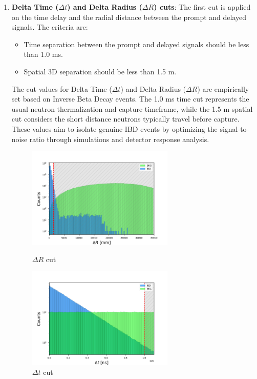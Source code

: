 \begin{enumerate}
	\item \textbf{Delta Time ($\Delta t$) and Delta Radius ($\Delta R$) cuts}: The first cut is applied on the time delay and the radial distance between the prompt and delayed signals. The criteria are:
	\begin{itemize}
		\item Time separation between the prompt and delayed signals should be less than 1.0 ms.
		\item Spatial 3D separation should be less than 1.5 m.
	\end{itemize}

	The cut values for Delta Time (\(\Delta t\)) and Delta Radius (\(\Delta R\)) are empirically set based on Inverse Beta Decay events. The 1.0 ms time cut represents the usual neutron thermalization and capture timeframe, while the 1.5 m spatial cut considers the short distance neutrons typically travel before capture. These values aim to isolate genuine IBD events by optimizing the signal-to-noise ratio through simulations and detector response analysis.

\begin{figure}[h!]
	\centering
	\begin{minipage}{0.5\textwidth}
		\centering
		\includegraphics[width=7cm]{Images/Cut/delta_radius.png}
		\caption{$\Delta R$ cut}
		\label{fig:delta_radius_cut}
	\end{minipage}%
	\begin{minipage}{0.5\textwidth}
		\centering
		\includegraphics[width=7cm]{Images/Cut/delta_time.png}
		\caption{$\Delta t$ cut}
		\label{fig:delta_t_cut}
	\end{minipage}
\end{figure}



\end{enumerate}
